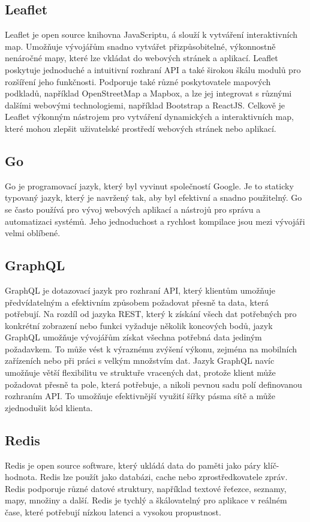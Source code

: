 \subsection{Leaflet}
Leaflet je open source knihovna JavaScriptu, á slouží k vytváření interaktivních map. Umožňuje vývojářům snadno vytvářet přizpůsobitelné, výkonnostně nenáročné mapy, které lze vkládat do webových stránek a aplikací. Leaflet poskytuje jednoduché a intuitivní rozhraní API a také širokou škálu modulů pro rozšíření jeho funkčnosti. Podporuje také různé poskytovatele mapových podkladů, například OpenStreetMap a Mapbox, a lze jej integrovat s různými dalšími webovými technologiemi, například Bootstrap a ReactJS. Celkově je Leaflet výkonným nástrojem pro vytváření dynamických a interaktivních map, které mohou zlepšit uživatelské prostředí webových stránek nebo aplikací.
\subsection{Go}
Go je programovací jazyk, který byl vyvinut společností Google. Je to staticky typovaný jazyk, který je navržený tak, aby byl efektivní a snadno použitelný. Go se často používá pro vývoj webových aplikací a nástrojů pro správu a automatizaci systémů. Jeho jednoduchost a rychlost kompilace jsou mezi vývojáři velmi oblíbené.

\subsection{GraphQL}
GraphQL je dotazovací jazyk pro rozhraní API, který klientům umožňuje předvídatelným a efektivním způsobem požadovat přesně ta data, která potřebují. Na rozdíl od jazyka REST, který k získání všech dat potřebných pro konkrétní zobrazení nebo funkci vyžaduje několik koncových bodů, jazyk GraphQL umožňuje vývojářům získat všechna potřebná data jediným požadavkem. To může vést k výraznému zvýšení výkonu, zejména na mobilních zařízeních nebo při práci s velkým množstvím dat. Jazyk GraphQL navíc umožňuje větší flexibilitu ve struktuře vracených dat, protože klient může požadovat přesně ta pole, která potřebuje, a nikoli pevnou sadu polí definovanou rozhraním API. To umožňuje efektivnější využití šířky pásma sítě a může zjednodušit kód klienta.
\subsection{Redis}
Redis je open source software, který ukládá data do paměti jako páry klíč-hodnota. Redis lze použít jako databázi, cache nebo zprostředkovatele zpráv. Redis podporuje různé datové struktury, například textové řeťezce, seznamy, mapy, množiny a další. Redis je tychlý a škálovatelný pro aplikace v reálném čase, které potřebují nízkou latenci a vysokou propustnost.

